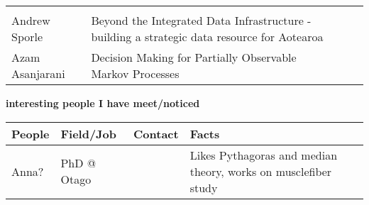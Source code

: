 \documentclass[
]{book}
\begin{document}
\begin{longtable}[]{@{}llll@{}}
\begin{minipage}[t]{0.22\columnwidth}
\strut
\end{minipage}\tabularnewline
\begin{minipage}[t]{0.22\columnwidth}\raggedright
Andrew Sporle\strut
\end{minipage} & \begin{minipage}[t]{0.22\columnwidth}\raggedright
Beyond the Integrated Data Infrastructure - building a strategic data resource for Aotearoa\strut
\end{minipage} & \begin{minipage}[t]{0.22\columnwidth}\raggedright
\strut
\end{minipage} & \begin{minipage}[t]{0.22\columnwidth}\raggedright
\strut
\end{minipage}\tabularnewline
\begin{minipage}[t]{0.22\columnwidth}\raggedright
Azam Asanjarani\strut
\end{minipage} & \begin{minipage}[t]{0.22\columnwidth}\raggedright
Decision Making for Partially Observable Markov Processes\strut
\end{minipage} & \begin{minipage}[t]{0.22\columnwidth}\raggedright
\strut
\end{minipage} & \begin{minipage}[t]{0.22\columnwidth}\raggedright
\strut
\end{minipage}\tabularnewline
\bottomrule
\end{longtable}

\textbf{interesting people I have meet/noticed}

\begin{longtable}[]{@{}llll@{}}
\toprule
\begin{minipage}[b]{0.22\columnwidth}\raggedright
People\strut
\end{minipage} & \begin{minipage}[b]{0.22\columnwidth}\raggedright
Field/Job\strut
\end{minipage} & \begin{minipage}[b]{0.22\columnwidth}\raggedright
Contact\strut
\end{minipage} & \begin{minipage}[b]{0.22\columnwidth}\raggedright
Facts\strut
\end{minipage}\tabularnewline
\midrule
\endhead
\begin{minipage}[t]{0.22\columnwidth}\raggedright
Anna?\strut
\end{minipage} & \begin{minipage}[t]{0.22\columnwidth}\raggedright
PhD @ Otago\strut
\end{minipage} & \begin{minipage}[t]{0.22\columnwidth}\raggedright
\strut
\end{minipage} & \begin{minipage}[t]{0.22\columnwidth}\raggedright
Likes Pythagoras and median theory, works on musclefiber study\strut
\end{minipage}\tabularnewline
\bottomrule
\end{longtable}
\end{document}
